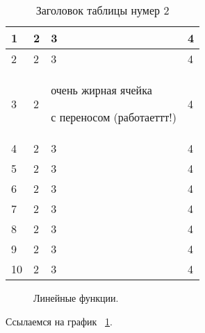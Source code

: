 \documentclass[a4paper,article,14pt]{extarticle}
\begin{document}
\begin{center}
    \begin{longtable}{|p{2cm}||p{3cm}|p{7cm}|p{3cm}|}
    \caption{Заголовок таблицы нумер 2}\\
    \hline
    1 & 2 & 3 & 4\\
    \hline
    2 & 2 & 3 & 4\\
    \hline
    3 & 2 & очень жирная ячейка \par с переносом (работаеттт!) & 4\\
    \hline
    4 & 2 & 3 & 4\\
    \hline
    5 & 2 & 3 & 4\\
    \hline
    6 & 2 & 3 & 4\\
    \hline
    7 & 2 & 3 & 4\\
    \hline
    8 & 2 & 3 & 4\\
    \hline
    9 & 2 & 3 & 4\\
    \hline
    10 & 2 & 3 & 4\\
    \hline


    \end{longtable}
\end{center}

\pagebreak

\begin{figure}[ht]
\begin{center}

\caption{
\label{graph-fig}
     Линейные функции.}
\end {center}
\end {figure}
Ссылаемся на график ~\ref{graph-fig}.
\end{document}
